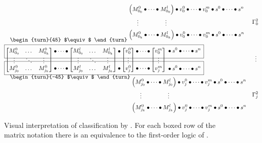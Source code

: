 \begingroup
\begin{figure}[ht]
  \def\classmatraise#1{%
    \begin{aligned}
    #1 \\ {} \\ #1
    \end{aligned}
  }
  \def\classmateq{%
    \matseqsup{0}
      \classmatraise{\monoidop\cdots\monoidop}
    \matseqsup{l}
      \classmatraise\monoidop
    \vecseqsup{0}
      \classmatraise{\monoidop\cdots\monoidop}
    \vecseqsup{m}
      \classmatraise{%
        {}\monoidop s^0\monoidop\cdots\monoidop s^n%
      }
  }
  \def\classmatlines#1{%
    \begin{alignedat}{2}
      \Big( &M^0_{{#1}_0} \monoidops {}&&M^l_{{#1}_0} \Big)
        \monoidop
        v^0_{#1} \monoidops v^m_{#1}
        \monoidop
        s^0 \monoidops s^n \\
      &\quad\!\vdots &&\quad\!\vdots \\
      \Big( &M^0_{{#1}_k} \monoidops {}&&M^l_{{#1}_k} \Big)
        \monoidop
        v^0_{#1} \monoidops v^m_{#1}
        \monoidop
        s^0 \monoidops s^n
    \end{alignedat}
  }

  \begin{align*}
    &\quad\raisebox{-11mm}[0mm]{%
       \begin{turn}{45}
         $\equiv$
       \end{turn}%
     }\; \classmatlines{0} &\Gamma^2_0 \\[-2mm]
    &\fbox{\raisebox{0mm}[0mm][6mm]{\hphantom{$\classmateq$}}} \\[-8mm]
    &\classmateq &\vdots\; \\[-10mm]
    &\fbox{\raisebox{0mm}[0mm][6mm]{\hphantom{$\classmateq$}}} \\
    &\quad\raisebox{11mm}[0mm]{%
       \begin{turn}{-45}
         $\equiv$
       \end{turn}%
     }\; \classmatlines{j} &\Gamma^2_j
  \end{align*}
\caption{Visual interpretation of classification by .
         For each boxed row of the matrix notation there is an equivalence
           to the first-order logic of .}
\label{f:class-mat-boxes}
\end{figure}
\endgroup


